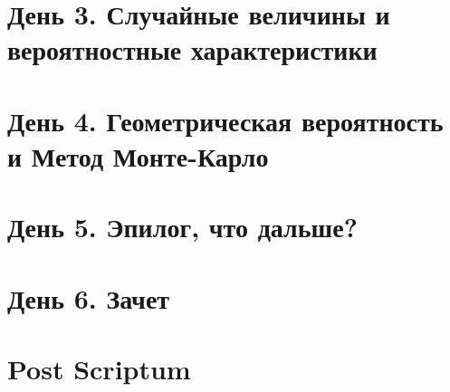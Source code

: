 \documentclass{article}
\theoremstyle{definition}
\theoremstyle{remark}
\begin{document}
\section{День 3. Случайные величины и вероятностные характеристики}

\section{День 4. Геометрическая вероятность и Метод Монте-Карло}

\section{День 5. Эпилог, что дальше?}

\section{День 6. Зачет}

\section*{Post Scriptum}
\end{document}
